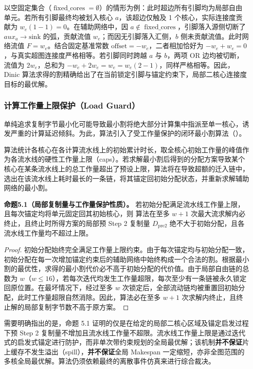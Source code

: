\documentclass[anonymous,notoc]{gmcm2026}
\begin{document}
以空固定集合（\(\operatorname{fixed\_cores} = \emptyset\)）的情形为例：此时超边所有引脚均为局部自由单元。若所有引脚最终均被划入核心 \(a\)，该超边仅触及 1 个核心，实际连接度贡献为 \(w_e (1 - 1) = 0\)。在辅助网络中，因 \(a \notin \operatorname{fixed\_cores}\)，引脚落入源侧切断了 \(aux_a \to \mathrm{sink}\) 的弧，贡献流值 \(w_e\)；而因无引脚落入汇侧，\(b\) 侧未贡献流值。此时网络流值 \(F = w_e\)。结合固定基准常数 \(\text{offset} = -w_e\)，二者相加恰好为 \(-w_e + w_e = 0\)，与真实超图连接度严格相等。若引脚同时跨越 \(a\) 与 \(b\)，两项 OR 边均被切断，流值为 \(2w_e\)，总和为 \(-w_e + 2w_e = w_e = w_e (2 - 1)\)，同样严格相等。因此，Dinic 算法\cite{ref9}求得的割精确给出了在当前锁定引脚与锚定约束下，局部二核心连接度目标的最优解。

\subsubsection{计算工作量上限保护（Load Guard）}

单纯追求复制字节最小化可能导致最小割将绝大部分计算集中指派至单一核心，诱发严重的计算延迟倾斜。为此，算法引入了受工作量保护的闭环最小割算法（\texttt{}）。

算法统计各核心在各计算流水线上的初始累计时长，取全核心初始工作量的峰值作为各流水线的硬性工作量上限（caps）。若求解最小割后得到的分配方案导致某个核心在某条流水线上的总工作量超出了预设上限，算法将在导致超额的迁入链中，选出在该流水线上耗时最长的一条链，将其锚定回初始分配状态，并重新求解辅助网络的最小割。

\textbf{命题5.1（局部复制量与工作量保护性质）。} 若初始分配满足流水线工作量上限，且每次锚定均将单元固定回其初始核心，则 \texttt{} 算法在至多 \(w + 1\) 次最大流求解内必终止，且终止时所得方案的局部预 Step 2 复制量 \(D_{\mathrm{pre2}}\) 绝不大于初始分配，且各流水线工作量均不超过上限。

\begin{proof} 初始分配始终完全满足工作量上限约束。由于每次锚定均与初始分配一致，初始分配在每一次增加锚定约束后的辅助网络中始终构成一个合法的割。根据最小割的最优性，求得的最小割代价必不高于初始分配的代价值。由于局部自由链的总数为 \(w\)（\(w \le 16\)），若每次迭代均发生工作量超限，每次至少有一条链被永久锁定回原位置。在最坏情况下，经过至多 \(w\) 次锁定后，全部流动链均被重置回初始分配，此时工作量超限自然消除。因此，算法必在至多 \(w + 1\) 次求解内终止，且终止解的局部复制字节数不高于原方案。 \end{proof}

需要明确指出的是，命题 5.1 证明的仅是在给定的局部二核心区域及锚定启发过程下预 Step 2 复制量不增加且流水线工作量不超限。流水线工作量上限是通过迭代式的启发式锚定进行防护，而非单次带约束规划的全局最优解；该机制\textbf{并不保证}片上缓存不发生溢出（spill），\textbf{并不保证}全局 Makespan 一定缩短，亦非全图范围的多核全局最优解。算法仍须依赖最终的离散事件仿真来进行综合裁决。
\end{document}
